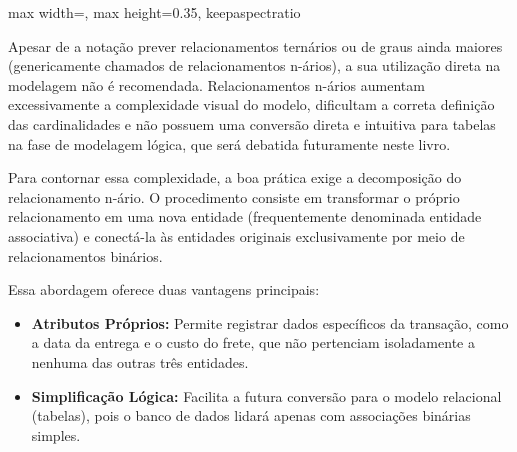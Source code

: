 \begin{diagramER}
    \vspace{0.3cm}

    \begin{center}
    \begin{adjustbox}{max width=\linewidth, max height=0.35\textheight, keepaspectratio}
\end{adjustbox}
    \end{center}
\end{diagramER}

Apesar de a notação prever relacionamentos ternários ou de graus ainda maiores (genericamente chamados de relacionamentos n-ários), a sua utilização direta na modelagem não é recomendada. Relacionamentos n-ários aumentam excessivamente a complexidade visual do modelo, dificultam a correta definição das cardinalidades e não possuem uma conversão direta e intuitiva para tabelas na fase de modelagem lógica, que será debatida futuramente neste livro.

Para contornar essa complexidade, a boa prática exige a decomposição do relacionamento n-ário. O procedimento consiste em transformar o próprio relacionamento em uma nova entidade (frequentemente denominada entidade associativa) e conectá-la às entidades originais exclusivamente por meio de relacionamentos binários. 

Essa abordagem oferece duas vantagens principais:

\begin{itemize}
    \item \textbf{Atributos Próprios:} Permite registrar dados específicos da transação, como a data da entrega e o custo do frete, que não pertenciam isoladamente a nenhuma das outras três entidades.
    \item \textbf{Simplificação Lógica:} Facilita a futura conversão para o modelo relacional (tabelas), pois o banco de dados lidará apenas com associações binárias simples.
\end{itemize}

